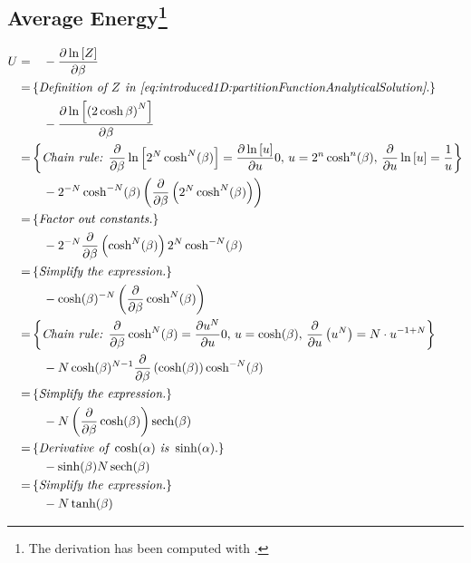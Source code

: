 \subsection[]{Average Energy\footnote{The derivation has been computed with \textcite{mathemathica}.}}
	\label{a:derivations:averageEnergy}
	\begin{align*}
		\firstline{
			\averageEnergy
		}{
			- \frac{\partial \ln \left[ \partitionfunction \right]}{\partial \beta}
		}
		\comment{
			\textit{Definition of \partitionfunction in \cref{eq:introduced1D:partitionFunctionAnalyticalSolution}}.
		}
		\content{
			- \frac{\partial \ln \left[ \left(2 \cosh \beta \right)^N \right]}{\partial \beta}
		}
		\comment{
			\textit{Chain rule: } 
			\frac{\partial}{\partial \beta}\ln\left[2^N \cosh^N(\beta) \right] = \frac{\partial \ln\left[ u \right]}{\partial u} 0, \, 
			u = 2^n \cosh^n(\beta),\,
			\frac{\partial}{\partial u} \ln\left[ u \right] = \frac{1}{u}
		}
		\content{
			- 2^{-N} \cosh^{-N}(\beta) \left( \frac{\partial}{\partial \beta} \left( 2^N \cosh^N(\beta)\right)\right)
		}
		\comment{
			\textit{Factor out constants.}
		}
		\content{
 			- 2^{- N} \frac{\partial}{\partial \beta}\left(\cosh^{N}(\beta)\right) 2^{N} \cosh^{-N}(\beta)
		}
		\comment{
			\textit{Simplify the expression.}
		}
		\content{
			-\cosh(\beta) ^{-N} \left(\frac{\partial}{\partial \beta} \cosh^{N}(\beta)\right)
		}
		\comment{
			\textit{Chain rule: } \frac{\partial}{\partial \beta} \cosh^{N}(\beta)=\frac{\partial u^N}{\partial u} 0,\, 
			u = \cosh(\beta),\, 
			\frac{\partial}{\partial u}\left(u^N\right) = N \cdot u^{-1 + N}
		}
		\content{
			- N \cosh(\beta)^{N-1} \frac{\partial}{\partial \beta}\left( \cosh (\beta) \right) \cosh^{-N} (\beta)
		}
		\comment{
			\textit{Simplify the expression.}
		}
		\content{
			- N \left(\frac{\partial}{\partial \beta} \cosh(\beta) \right) \sech(\beta)
		}
		\comment{
			\textit{Derivative of } \cosh(\alpha) \textit{ is } \sinh(\alpha).
		}
		\content{
			- \sinh(\beta) N \sech(\beta)
		}
		\comment{
			\textit{Simplify the expression.}
		}
		\content{
		- N \tanh(\beta)
		}
	\end{align*}

